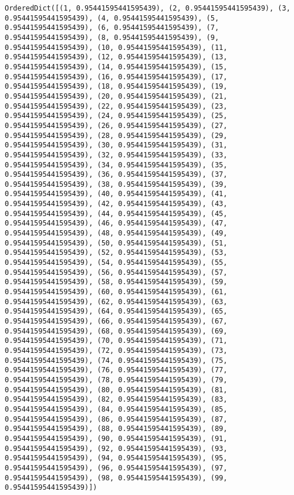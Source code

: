 \documentclass[11pt]{article}
\begin{document}
\begin{Verbatim}[commandchars=\\\{\}]
OrderedDict([(1, 0.95441595441595439), (2, 0.95441595441595439), (3, 0.95441595441595439), (4, 0.95441595441595439), (5, 0.95441595441595439), (6, 0.95441595441595439), (7, 0.95441595441595439), (8, 0.95441595441595439), (9, 0.95441595441595439), (10, 0.95441595441595439), (11, 0.95441595441595439), (12, 0.95441595441595439), (13, 0.95441595441595439), (14, 0.95441595441595439), (15, 0.95441595441595439), (16, 0.95441595441595439), (17, 0.95441595441595439), (18, 0.95441595441595439), (19, 0.95441595441595439), (20, 0.95441595441595439), (21, 0.95441595441595439), (22, 0.95441595441595439), (23, 0.95441595441595439), (24, 0.95441595441595439), (25, 0.95441595441595439), (26, 0.95441595441595439), (27, 0.95441595441595439), (28, 0.95441595441595439), (29, 0.95441595441595439), (30, 0.95441595441595439), (31, 0.95441595441595439), (32, 0.95441595441595439), (33, 0.95441595441595439), (34, 0.95441595441595439), (35, 0.95441595441595439), (36, 0.95441595441595439), (37, 0.95441595441595439), (38, 0.95441595441595439), (39, 0.95441595441595439), (40, 0.95441595441595439), (41, 0.95441595441595439), (42, 0.95441595441595439), (43, 0.95441595441595439), (44, 0.95441595441595439), (45, 0.95441595441595439), (46, 0.95441595441595439), (47, 0.95441595441595439), (48, 0.95441595441595439), (49, 0.95441595441595439), (50, 0.95441595441595439), (51, 0.95441595441595439), (52, 0.95441595441595439), (53, 0.95441595441595439), (54, 0.95441595441595439), (55, 0.95441595441595439), (56, 0.95441595441595439), (57, 0.95441595441595439), (58, 0.95441595441595439), (59, 0.95441595441595439), (60, 0.95441595441595439), (61, 0.95441595441595439), (62, 0.95441595441595439), (63, 0.95441595441595439), (64, 0.95441595441595439), (65, 0.95441595441595439), (66, 0.95441595441595439), (67, 0.95441595441595439), (68, 0.95441595441595439), (69, 0.95441595441595439), (70, 0.95441595441595439), (71, 0.95441595441595439), (72, 0.95441595441595439), (73, 0.95441595441595439), (74, 0.95441595441595439), (75, 0.95441595441595439), (76, 0.95441595441595439), (77, 0.95441595441595439), (78, 0.95441595441595439), (79, 0.95441595441595439), (80, 0.95441595441595439), (81, 0.95441595441595439), (82, 0.95441595441595439), (83, 0.95441595441595439), (84, 0.95441595441595439), (85, 0.95441595441595439), (86, 0.95441595441595439), (87, 0.95441595441595439), (88, 0.95441595441595439), (89, 0.95441595441595439), (90, 0.95441595441595439), (91, 0.95441595441595439), (92, 0.95441595441595439), (93, 0.95441595441595439), (94, 0.95441595441595439), (95, 0.95441595441595439), (96, 0.95441595441595439), (97, 0.95441595441595439), (98, 0.95441595441595439), (99, 0.95441595441595439)])

\end{Verbatim}
\end{document}
